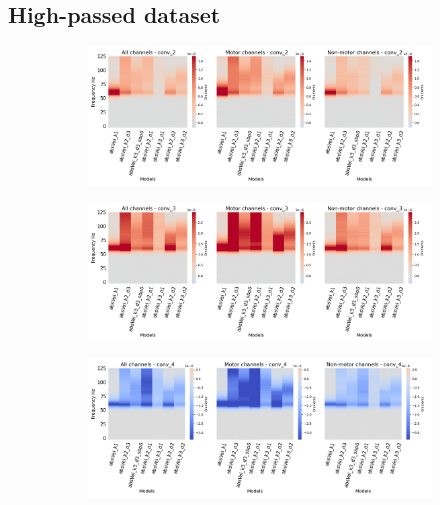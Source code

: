 \subsection*{High-passed dataset}\label{subsec:absVel-high-passed-dataset-appendixB}
\begin{figure}[!htpb]
\centering
\begin{subfigure}[b]{\textwidth}
   \includegraphics[width=1\linewidth]{img/appendix/A/conv-2/hp-sm/absVel-model-gradients_all_kinds}
   \caption{}
   \label{fig:absVel-hp-shifted-grads-conv-2}
\end{subfigure}

\begin{subfigure}[b]{\textwidth}
   \includegraphics[width=1\linewidth]{img/appendix/A/conv-3/hp-sm/absVel-model-gradients_all_kinds}
   \caption{}
   \label{fig:absVel-hp-shifted-grads-conv-3}
\end{subfigure}

\begin{subfigure}[b]{\textwidth}
   \includegraphics[width=1\linewidth]{img/appendix/A/conv-4/hp-sm/absVel-model_gradients_all_kinds}
   \caption{}
   \label{fig:absVel-hp-shifted-grads-conv-4}
\end{subfigure}


\end{figure}
